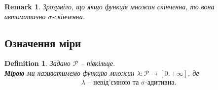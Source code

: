 \documentclass[a4paper, 10pt]{article}
\theoremstyle{theoremdd}
\newtheorem{definition}[theorem]{Definition}
\newtheorem{remark}[theorem]{Remark}
\begin{document}
\begin{remark}
Зрозуміло, що якщо функція множин скінченна, то вона автоматично $\sigma$-скінченна.
\end{remark}

\subsection{Означення міри}
\begin{definition}
Задано $\mathcal{P}$ -- півкільце.\\
\textbf{Мірою} ми називатимемо функцію множин $\lambda \colon \mathcal{P} \to [0,+\infty]$, де 
\begin{align*}
\lambda \text{ -- невід'ємною та $\sigma$-адитивна.}
\end{align*}
\end{definition}
\end{document}
